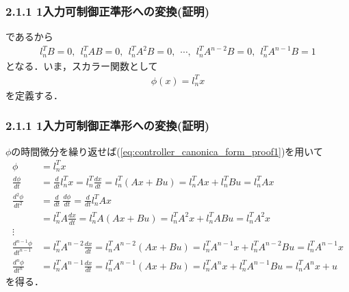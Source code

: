 \begin{frame}[t]
\frametitle{2.1.1 1入力可制御正準形への変換(証明)}

であるから
\begin{align}
		 l_n^T B =0 
		 ,\ \ 
		 l_n^T A B =0
		 ,\ \ 
		 l_n^T A^2 B =0
		 ,\ \ 
		 \cdots 
		 ,\ \ 
		 l_n^T A^{n-2}B =0
		 ,\ \ 
		 l_n^T A^{n-1}B =1
\label{eq:controller_canonica_form_proof1}
\end{align}
となる．いま，スカラー関数として
\begin{align}
	\phi(x) = l_n^T x
\end{align}
を定義する．
\end{frame}

\begin{frame}[t]
\frametitle{2.1.1 1入力可制御正準形への変換(証明)}
$\phi$の時間微分を繰り返せば(\ref{eq:controller_canonica_form_proof1})を用いて
\begin{align}
	\phi &= l_n^T x
\nonumber\\
	\frac{d \phi}{dt} 
	& = \frac{d}{dt} l_n^T x 
	= l_n^T \frac{dx}{dt} 
	= l_n^T (Ax+Bu) 
	= l_n^T A x + l_n^T Bu 
	= l_n^T A x 
\nonumber\\
	\frac{d^2 \phi}{dt^2} 
	& = \frac{d}{dt} \ \frac{d \phi}{dt}
	= \frac{d}{dt} l_n^T A x 
\nonumber \\ &
	= l_n^T A \frac{dx}{dt} 
	= l_n^T A (Ax+Bu) 
	= l_n^T A^2 x + l_n^T A Bu 
	= l_n^T A^2 x 
\nonumber\\
	\vdots
\\
	\frac{d^{n-1} \phi}{dt^{n-1}} 
	& = l_n^T A^{n-2} \frac{dx}{dt} 
	= l_n^T A^{n-2} (Ax+Bu) 
	= l_n^T A^{n-1} x + l_n^T A^{n-2} Bu 
	= l_n^T A^{n-1} x 
\nonumber\\
	\frac{d^{n} \phi}{dt^{n}} 
	& = l_n^T A^{n-1} \frac{dx}{dt} 
	= l_n^T A^{n-1} (Ax+Bu) 
	= l_n^T A^{n} x + l_n^T A^{n-1} Bu 
	= l_n^T A^{n} x + u
\nonumber
\end{align}
を得る．
\end{frame}


